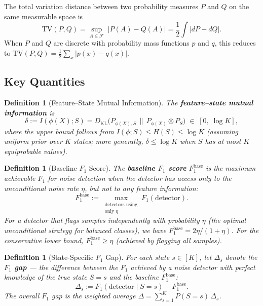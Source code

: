 \documentclass[12pt,a4paper]{article}
\newtheorem{definition}[theorem]{Definition}
\newcommand{\KL}{D_{\mathrm{KL}}}
\newcommand{\TV}{\mathrm{TV}}
\newcommand{\gap}{\Delta}
\begin{document}
The total variation distance between two probability measures $P$ and $Q$ on
the same measurable space is
\begin{equation}\label{eq:tv-def}
    \TV(P, Q) = \sup_{A \in \mathcal{F}}\; \bigl| P(A) - Q(A) \bigr|
              = \frac12 \int \bigl|dP - dQ\bigr|.
\end{equation}
When $P$ and $Q$ are discrete with probability mass functions $p$ and $q$, this
reduces to $\TV(P,Q) = \frac12\sum_x |p(x)-q(x)|$.

\subsection{Key Quantities}

\begin{definition}[Feature--State Mutual Information]
\label{def:delta}
The \textbf{feature--state mutual information} is
\begin{equation}\label{eq:delta}
    \delta := I(\phi(X); S)
           = \KL\bigl(P_{\phi(X),S} \,\big\|\, P_{\phi(X)} \otimes P_S\bigr)
           \;\in\; [0,\; \log K],
\end{equation}
where the upper bound follows from $I(\phi; S) \leq H(S) \leq \log K$
(assuming uniform prior over $K$ states; more generally, $\delta \leq \log K$
when $S$ has at most $K$ equiprobable values).
\end{definition}

\begin{definition}[Baseline $F_1$ Score]
\label{def:f1base}
The \textbf{baseline $F_1$ score} $F_1^{\mathrm{base}}$ is the maximum
achievable $F_1$ for noise detection when the detector has access only to
the unconditional noise rate $\eta$, but not to any feature information:
\begin{equation}\label{eq:f1base}
    F_1^{\mathrm{base}} := \max_{\substack{\text{detectors using}\\\text{only }\eta}}
                           F_1(\text{detector}).
\end{equation}
For a detector that flags samples independently with probability $\eta$
(the optimal unconditional strategy for balanced classes), we have
$F_1^{\mathrm{base}} = 2\eta/(1+\eta)$.  For the conservative lower bound,
$F_1^{\mathrm{base}} \geq \eta$ (achieved by flagging all samples).
\end{definition}

\begin{definition}[State-Specific $F_1$ Gap]
\label{def:gap}
For each state $s \in [K]$, let $\gap_s$ denote the \textbf{$F_1$ gap} --- the
difference between the $F_1$ achieved by a noise detector with perfect knowledge
of the true state $S=s$ and the baseline $F_1^{\mathrm{base}}$:
\begin{equation}\label{eq:gap-s}
    \gap_s := F_1(\text{detector} \mid S=s) - F_1^{\mathrm{base}}.
\end{equation}
The overall $F_1$ gap is the weighted average $\gap = \sum_{s=1}^K P(S=s)\,\gap_s$.
\end{definition}
\end{document}
